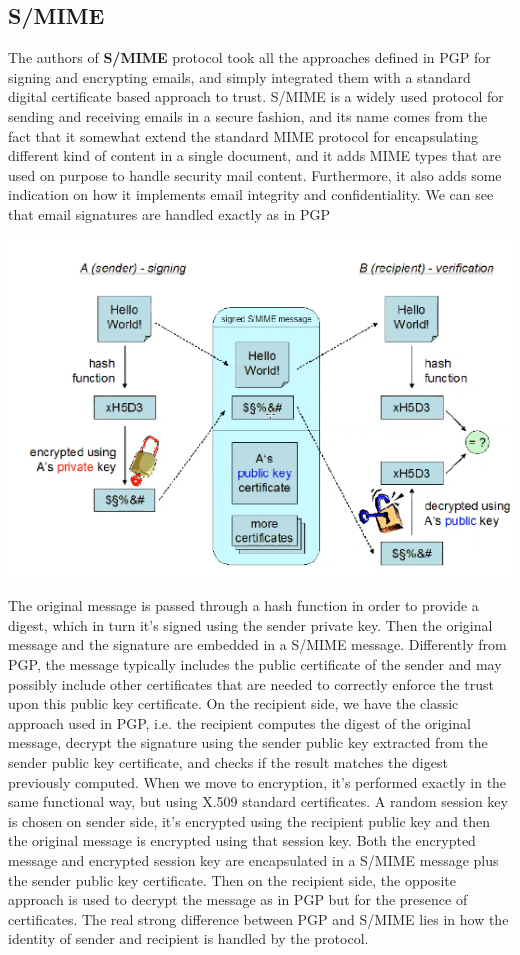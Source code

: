 \subsection{S/MIME}
The authors of \textbf{S/MIME} protocol took all the approaches defined in PGP for signing and encrypting emails, and simply integrated them with a standard digital certificate based approach to trust. S/MIME is a widely used protocol for sending and receiving emails in a secure fashion, and its name comes from the fact that it somewhat extend the standard MIME protocol for encapsulating different kind of content in a single document, and it adds MIME types that are used on purpose to handle security mail content. Furthermore, it also adds some indication on how it implements email integrity and confidentiality. We can see that email signatures are handled exactly as in PGP
\begin{center}
\includegraphics[scale=0.45]{./images/smime_schema.png}
\end{center}
The original message is passed through a hash function in order to provide a digest, which in turn it's signed using the sender private key. Then the original message and the signature are embedded in a S/MIME message. Differently from PGP, the message typically includes the public certificate of the sender and may possibly include other certificates that are needed to correctly enforce the trust upon this public key certificate. On the recipient side, we have the classic approach used in PGP, i.e. the recipient computes the digest of the original message, decrypt the signature using the sender public key extracted from the sender public key certificate, and checks if the result matches the digest previously computed. When we move to encryption, it's performed exactly in the same functional way, but using X.509 standard certificates. A random session key is chosen on sender side, it's encrypted using the recipient public key and then the original message is encrypted using that session key. Both the encrypted message and encrypted session key are encapsulated in a S/MIME message plus the sender public key certificate. Then on the recipient side, the opposite approach is used to decrypt the message as in PGP but for the presence of certificates. The real strong difference between PGP and S/MIME lies in how the identity of sender and recipient is handled by the protocol.

